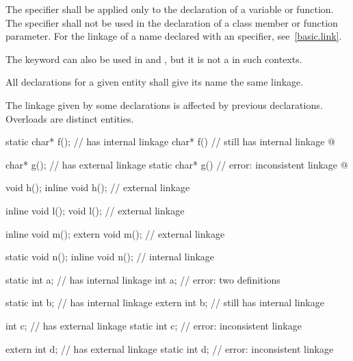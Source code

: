 \pnum
{}%
The  specifier shall be applied only to the declaration of a variable
or function. The  specifier shall not be used in the
declaration of a class member or function parameter.
%
%
For the linkage of a name declared with an  specifier,
see~\ref{basic.link}.
\begin{note}
The  keyword can also be used in
 and
, but it is not a
 in such contexts.
\end{note}

\pnum
All declarations for a given entity shall give its name the same linkage.
\begin{note}
The linkage given by some declarations is affected by previous declarations.
Overloads are distinct entities.
\end{note}
\begin{example}
\begin{codeblock}
static char* f();               //  has internal linkage
char* f()                       //  still has internal linkage
  { @\commentellip@ }

char* g();                      //  has external linkage
static char* g()                // error: inconsistent linkage
  { @\commentellip@ }

void h();
inline void h();                // external linkage

inline void l();
void l();                       // external linkage

inline void m();
extern void m();                // external linkage

static void n();
inline void n();                // internal linkage

static int a;                   //  has internal linkage
int a;                          // error: two definitions

static int b;                   //  has internal linkage
extern int b;                   //  still has internal linkage

int c;                          //  has external linkage
static int c;                   // error: inconsistent linkage

extern int d;                   //  has external linkage
static int d;                   // error: inconsistent linkage
\end{codeblock}
\end{example}

